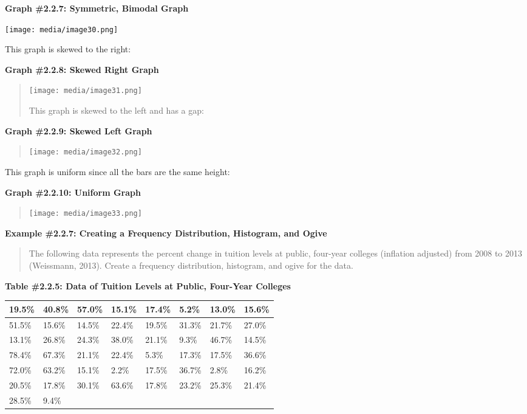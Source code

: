\documentclass[]{book}
\begin{document}
\textbf{Graph \#2.2.7: Symmetric, Bimodal Graph}

\texttt{[image: media/image30.png]}

This graph is skewed to the right:

\textbf{Graph \#2.2.8: Skewed Right Graph}

\begin{quote}
\texttt{[image: media/image31.png]}

This graph is skewed to the left and has a gap:
\end{quote}

\textbf{Graph \#2.2.9: Skewed Left Graph}

\begin{quote}
\texttt{[image: media/image32.png]}
\end{quote}

This graph is uniform since all the bars are the same height:

\textbf{Graph \#2.2.10: Uniform Graph}

\begin{quote}
\texttt{[image: media/image33.png]}
\end{quote}

\textbf{Example \#2.2.7: Creating a Frequency Distribution, Histogram, and
Ogive}

\begin{quote}
The following data represents the percent change in tuition levels at
public, four-year colleges (inflation adjusted) from 2008 to 2013
(Weissmann, 2013). Create a frequency distribution, histogram, and
ogive for the data.
\end{quote}

\textbf{Table \#2.2.5: Data of Tuition Levels at Public, Four-Year Colleges}

\begin{longtable}[]{@{}llllllll@{}}
\toprule
19.5\% & 40.8\% & 57.0\% & 15.1\% & 17.4\% & 5.2\% & 13.0\% & 15.6\%\tabularnewline
\midrule
\endhead
51.5\% & 15.6\% & 14.5\% & 22.4\% & 19.5\% & 31.3\% & 21.7\% & 27.0\%\tabularnewline
13.1\% & 26.8\% & 24.3\% & 38.0\% & 21.1\% & 9.3\% & 46.7\% & 14.5\%\tabularnewline
78.4\% & 67.3\% & 21.1\% & 22.4\% & 5.3\% & 17.3\% & 17.5\% & 36.6\%\tabularnewline
72.0\% & 63.2\% & 15.1\% & 2.2\% & 17.5\% & 36.7\% & 2.8\% & 16.2\%\tabularnewline
20.5\% & 17.8\% & 30.1\% & 63.6\% & 17.8\% & 23.2\% & 25.3\% & 21.4\%\tabularnewline
28.5\% & 9.4\% & & & & & &\tabularnewline
\bottomrule
\end{longtable}
\end{document}
